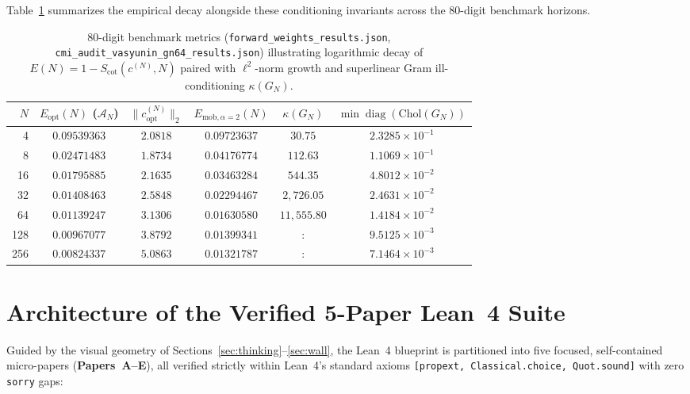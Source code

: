 \documentclass[11pt,a4paper]{article}
\begin{document}
Table~\ref{tab:horizons} summarizes the empirical decay alongside these conditioning invariants across the $80$-digit benchmark horizons.

\begin{table}[h!]
\centering
\small
\setlength{\tabcolsep}{6pt}
\begin{tabular}{@{}rccccc@{}}
\toprule
$N$ & $E_{\mathrm{opt}}(N)$ ($\mathcal{A}_N$) & $\|c_{\mathrm{opt}}^{(N)}\|_2$ & $E_{\mathrm{mob},\alpha=2}(N)$ & $\kappa(G_N)$ & $\min \operatorname{diag}(\mathrm{Chol}(G_N))$ \\
\midrule
4   & $0.09539363$ & $2.0818$ & $0.09723637$ & $30.75$      & $2.3285 \times 10^{-1}$ \\
8   & $0.02471483$ & $1.8734$ & $0.04176774$ & $112.63$     & $1.1069 \times 10^{-1}$ \\
16  & $0.01795885$ & $2.1635$ & $0.03463284$ & $544.35$     & $4.8012 \times 10^{-2}$ \\
32  & $0.01408463$ & $2.5848$ & $0.02294467$ & $2{,}726.05$  & $2.4631 \times 10^{-2}$ \\
64  & $0.01139247$ & $3.1306$ & $0.01630580$ & $11{,}555.80$ & $1.4184 \times 10^{-2}$ \\
128 & $0.00967077$ & $3.8792$ & $0.01399341$ &:          & $9.5125 \times 10^{-3}$ \\
256 & $0.00824337$ & $5.0863$ & $0.01321787$ &:          & $7.1464 \times 10^{-3}$ \\
\bottomrule
\end{tabular}
\caption{$80$-digit benchmark metrics (\texttt{forward\_weights\_results.json}, \texttt{cmi\_audit\_vasyunin\_gn64\_results.json}) illustrating logarithmic decay of $E(N) = 1 - S_{\mathrm{cot}}(c^{(N)}, N)$ paired with $\ell^2$-norm growth and superlinear Gram ill-conditioning $\kappa(G_N)$.}
\label{tab:horizons}
\end{table}

\section{Architecture of the Verified 5-Paper Lean~4 Suite}\label{sec:suite}

Guided by the visual geometry of Sections~\ref{sec:thinking}--\ref{sec:wall}, the Lean~4 blueprint is partitioned into five focused, self-contained micro-papers (\textbf{Papers~A--E}), all verified strictly within Lean~4's standard axioms \texttt{[propext, Classical.choice, Quot.sound]} with zero \texttt{sorry} gaps:
\end{document}
